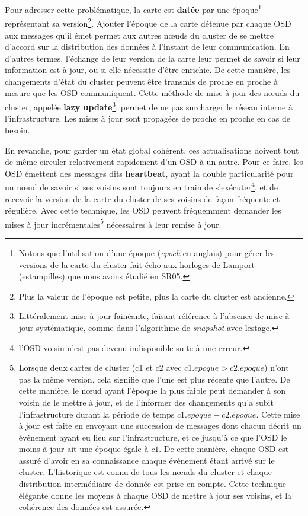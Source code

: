 Pour adresser cette problématique, la carte est \textbf{datée} par une époque\footnote{Notons que l'utilisation d'une époque (\emph{epoch} en anglais) pour gérer les versions de la carte du cluster fait écho aux horloges de Lamport (estampilles) que nous avons étudié en SR05.} représentant sa version\footnote{Plus la valeur de l'époque est petite, plus la carte du cluster est ancienne.}. Ajouter l'époque de la carte détenue par chaque OSD aux messages qu'il émet permet aux autres nœuds du cluster de se mettre d'accord sur la distribution des données à l'instant de leur communication. En d'autres termes, l'échange de leur version de la carte leur permet de savoir si leur information est à jour, ou si elle nécessite d'être enrichie. De cette manière, les  changements d'état du cluster peuvent être transmis de proche en proche à mesure que les OSD communiquent. Cette méthode de mise à jour des nœuds du cluster, appelée \textbf{lazy update}\footnote{Littéralement \og{}mise à jour fainéante\fg{}, faisant référence à l'absence de mise à jour systématique, comme dans l'algorithme de \textit{snapshot} avec lestage.}, permet de ne pas surcharger le réseau interne à l'infrastructure. Les mises à jour sont propagées de proche en proche en cas de besoin.

En revanche, pour garder un état global cohérent, ces actualisations doivent tout de même circuler relativement rapidement d'un OSD à un autre. Pour ce faire, les OSD émettent des messages dits \og{}\textbf{heartbeat}\fg{}, ayant la double particularité pour un nœud de savoir si ses voisins sont toujours en train de s’exécuter\footnote{\ie l'OSD voisin n'est pas devenu indisponible suite à une erreur.}, et de recevoir la version de la carte du cluster de ses voisins de façon fréquente et régulière. Avec cette technique, les OSD peuvent fréquemment demander les mises à jour incrémentales\footnote{Lorsque deux cartes de cluster (c1 et c2 avec $c1.epoque > c2.epoque$) n'ont pas la même version, cela signifie que l'une est plus récente que l'autre. De cette manière, le nœud ayant l'époque la plus faible peut demander à son voisin de le mettre à jour, et de l'informer des changements qu'a subit l’infrastructure durant la période de temps $c1.epoque - c2.epoque$. Cette mise à jour est faite en envoyant une succession de messages dont chacun décrit un événement ayant eu lieu sur l’infrastructure, et ce jusqu’à ce que l'OSD le moins à jour ait une époque égale à $c1$. De cette manière, chaque OSD est assuré d'avoir en sa connaissance chaque événement étant arrivé sur le cluster. L'historique est connu de tous les nœuds du cluster et chaque distribution intermédiaire de donnée est prise en compte. Cette technique élégante donne les moyens à chaque OSD de mettre à jour ses voisins, et la cohérence des données est assurée.} nécessaires à leur remise à jour. 

